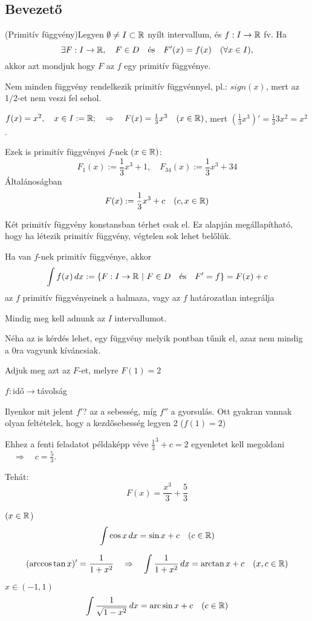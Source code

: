 \documentclass[a4paper,11.5pt]{article}
\DeclareMathOperator{\arc}{arc}
\begin{document}
	\subsection{Bevezető}
	\begin{revision}
		(Primitív függvény)\quad Legyen $\emptyset\not=I\subset\mathbb{R}$ nyílt intervallum, és $f:I\to\mathbb{R}$ fv. Ha 
		\[\exists F:I\to\mathbb{R}, \quad F\in D\quad  \text{és}\quad  F'(x)=f(x) \quad (\forall x\in I),\]
		akkor azt mondjuk hogy $F$ az $f$ egy primitív függvénye.
	\end{revision}
	Nem minden függvény rendelkezik primitív függvénnyel, pl.: $sign(x)$, mert az 1/2-et nem veszi fel sehol.
	\begin{note}
	$f(x)=x^2,\quad x\in I:=\mathbb{R};\quad \Rightarrow\quad F(x)=\frac{1}{3}x^3\quad (x\in\mathbb{R})$, mert $\left(\frac{1}{3}x^3\right)'=\frac{1}{3}3x^2=x^2$.
	
	Ezek is primitív függvényei $f$-nek $(x\in\mathbb{R})$:
	\[ F_1(x):=\frac{1}{3}x^3+1,\quad  F_{34}(x):=\frac{1}{3}x^3+34 \]
	Általánoságban
	\[ F(x):=\frac{1}{3}x^3+c\quad (c, x\in\mathbb{R}) \]
	\end{note}
	Két primitív függvény konstansban térhet csak el. Ez alapján megállapítható, hogy ha létezik primitív függvény, végtelen sok lehet belőlük.
	\begin{note}
		Ha van $f$-nek primitív függvénye, akkor
		\[  \int f(x)\,dx:=\{F:I\to\mathbb{R}~|~F\in D \text{\quad és\quad } F'=f \} =F(x) + c \]
		az $f$ primitív függvényeinek a halmaza, vagy az $f$ határozatlan integrálja
	\end{note}
	Mindig meg kell adnunk az $I$ intervallumot.
	
	Néha az is kérdés lehet, egy függvény melyik pontban tűnik el, azaz nem mindig a 0ra vagyunk kíváncsiak.
	\begin{task}
		Adjuk meg azt az $F$-et, melyre $F(1)=2$
	\end{task}
	\begin{revision}
		$f:$idő$\to$távolság
		
		Ilyenkor mit jelent $f'$? az a sebesség, míg $f''$ a gyorsulás. Ott gyakran vannak olyan feltételek, hogy a kezdősebesség legyen 2 ($f(1)=2$)
		
		Ehhez a fenti feladatot példaképp véve $\frac{1}{3}^3+c=2$ egyenletet kell megoldani $\quad \Rightarrow\quad c=\frac{5}{3}$.
	\end{revision}
	Tehát:
	\[ F(x)=\frac{x^3}{3}+\frac{5}{3} \]
	\begin{task}$(x\in\mathbb{R}$)
		\[\int \cos x\,dx=\sin x+c\quad (c\in\mathbb{R}) \]
	\end{task}
	\begin{task}
		\[ (\arccos\tan x)' =\frac{1}{1+x^2}\quad \Rightarrow\quad \int\frac{1}{1+x^2}\,dx=\arctan x + c\quad (x,c\in \mathbb{R}) \]
	\end{task}
	\begin{task} $x\in(-1,1)$
		\[ \int\frac{1}{\sqrt{1-x^2}}\,dx=\arc\sin x + c \quad (c\in \R) \]
	\end{task}
\end{document}
